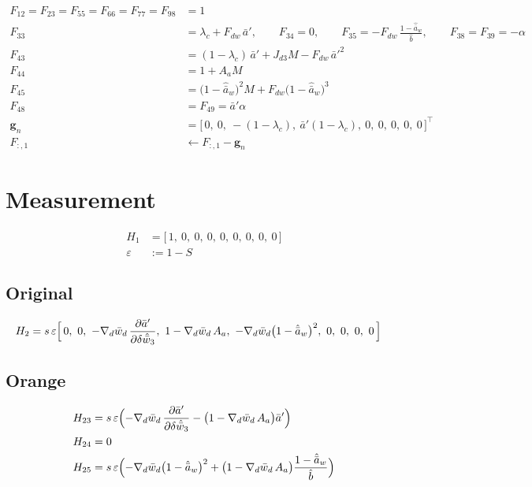 \documentclass[11pt,a4paper,fontset=none]{ctexart}
\newcommand{\ba}{\bar{a}}
\newcommand{\bw}{\bar{w}}
\newcommand{\ap}{\ba'}
\newcommand{\ah}{\hat{\ba}_w}
\newcommand{\bh}{\hat{b}}
\begin{document}
\begin{align*}
F_{12} = F_{23} = F_{55} = F_{66} = F_{77} = F_{98} &= 1 \\
F_{33} &= \lambda_c + F_{dw}\,\ap, \qquad F_{34} = 0, \qquad F_{35} = -F_{dw}\,\frac{1-\ah}{\bh}, \qquad F_{38} = F_{39} = -\alpha \\
F_{43} &= (1-\lambda_c)\,\ap + J_{d3}M - F_{dw}\,\ap^{2} \\
F_{44} &= 1 + A_a M \\
F_{45} &= \bigl(1-\ah\bigr)^{2}M + F_{dw}\bigl(1-\ah\bigr)^{3} \\
F_{48} &= F_{49} = \ap\alpha \\
\mathbf{g}_n &= \bigl[\,0,\ 0,\ -(1-\lambda_c),\ \ap(1-\lambda_c),\ 0,\ 0,\ 0,\ 0,\ 0\,\bigr]^{\top} \\
F_{:,1} &\leftarrow F_{:,1} - \mathbf{g}_n
\end{align*}

\section{Measurement}

\begin{align*}
H_1 &= \bigl[\,1,\ 0,\ 0,\ 0,\ 0,\ 0,\ 0,\ 0,\ 0\,\bigr] \\
\varepsilon &:= 1 - S
\end{align*}

\subsection*{Original}

\begin{align*}
H_2 &= s\,\varepsilon\Bigl[\,0,\ 0,\ -\nabla_d\bw_d\,\frac{\partial\ap}{\partial\delta\hat{\bw}_3},\
        1 - \nabla_d\bw_d\,A_a,\ -\nabla_d\bw_d\bigl(1-\ah\bigr)^{2},\ 0,\ 0,\ 0,\ 0\,\Bigr]
\end{align*}

\subsection*{Orange}

\begin{align*}
H_{23} &= s\,\varepsilon\Bigl(-\nabla_d\bw_d\,\frac{\partial\ap}{\partial\delta\hat{\bw}_3}
          - \bigl(1 - \nabla_d\bw_d\,A_a\bigr)\ap\Bigr) \\
H_{24} &= 0 \\
H_{25} &= s\,\varepsilon\Bigl(-\nabla_d\bw_d\bigl(1-\ah\bigr)^{2}
          + \bigl(1 - \nabla_d\bw_d\,A_a\bigr)\frac{1-\ah}{\bh}\Bigr)
\end{align*}
\end{document}

